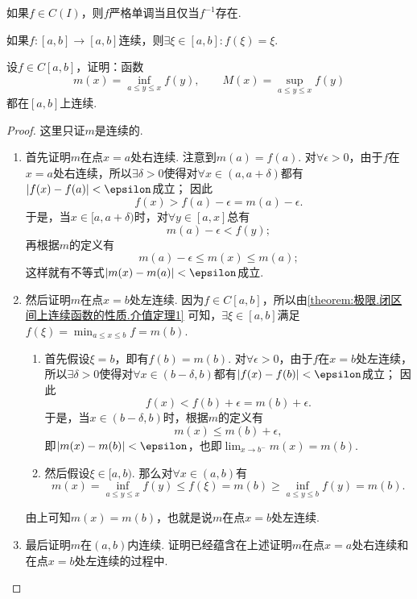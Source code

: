 \begin{corollary}
如果\(f \in C(I)\)，则\(f\)严格单调当且仅当\(f^{-1}\)存在.
\end{corollary}

\begin{corollary}
如果\(f\colon[a,b]\to[a,b]\)连续，则\(\exists\xi\in[a,b]: f(\xi)=\xi\).
\end{corollary}

\begin{example}
设\(f \in C[a,b]\)，证明：函数\[
m(x) = \inf_{a \leq y \leq x} f(y), \qquad
M(x) = \sup_{a \leq y \leq x} f(y)
\]都在\([a,b]\)上连续.
\begin{proof}
这里只证\(m\)是连续的.
\begin{enumerate}
\item 首先证明\(m\)在点\(x=a\)处右连续.
注意到\(m(a) = f(a)\).
对\(\forall\epsilon>0\)，由于\(f\)在\(x=a\)处右连续，所以\(\exists\delta>0\)使得对\(\forall x\in(a,a+\delta)\)都有\(\abs{f(x)-f(a)}<\epsilon\)成立；
因此\[
f(x)
> f(a) - \epsilon
= m(a) - \epsilon.
\]
于是，当\(x\in[a,a+\delta)\)时，对\(\forall y\in[a,x]\)总有\[
m(a) - \epsilon < f(y);
\]再根据\(m\)的定义有\[
m(a) - \epsilon \leq m(x) \leq m(a);
\]这样就有不等式\(\abs{m(x)-m(a)}<\epsilon\)成立.

\item 然后证明\(m\)在点\(x=b\)处左连续.
因为\(f \in C[a,b]\)，所以由\cref{theorem:极限.闭区间上连续函数的性质.介值定理1} 可知，\(\exists\xi\in[a,b]\)满足\(f(\xi) = \min_{a \leq x \leq b} f = m(b)\).
	\begin{enumerate}
	\item 首先假设\(\xi=b\)，即有\(f(b)=m(b)\).
	对\(\forall\epsilon>0\)，由于\(f\)在\(x=b\)处左连续，所以\(\exists\delta>0\)使得对\(\forall x\in(b-\delta,b)\)都有\(\abs{f(x)-f(b)}<\epsilon\)成立；
	因此\[
	f(x)
	< f(b) + \epsilon
	= m(b) + \epsilon.
	\]
	于是，当\(x\in(b-\delta,b)\)时，根据\(m\)的定义有\[
	m(x) \leq m(b) + \epsilon,
	\]
	即\(\abs{m(x)-m(b)}<\epsilon\)，也即\(\lim_{x \to b^-} m(x) = m(b)\).

	\item 然后假设\(\xi\in[a,b)\).
	那么对\(\forall x\in(a,b)\)有\[
	m(x) = \inf_{a \leq y \leq x} f(y)
	\leq f(\xi)
	= m(b)
	\geq \inf_{a \leq y \leq b} f(y)
	= m(b).
	\]
	\end{enumerate}
	由上可知\(m(x) = m(b)\)，也就是说\(m\)在点\(x=b\)处左连续.

\item 最后证明\(m\)在\((a,b)\)内连续.
证明已经蕴含在上述证明\(m\)在点\(x=a\)处右连续和在点\(x=b\)处左连续的过程中.
\qedhere
\end{enumerate}
\end{proof}
\end{example}

